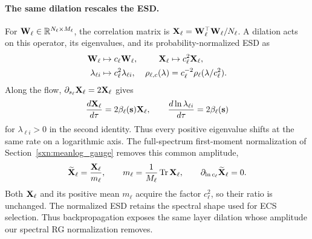 \paragraph{The same dilation rescales the ESD.}
For $\mathbf W_\ell\in\mathbb R^{N_\ell\times M_\ell}$, the correlation matrix is
$\mathbf X_\ell=\mathbf W_\ell^\top\mathbf W_\ell/N_\ell$.
A dilation acts on this operator, its eigenvalues, and its
probability-normalized ESD as
\[
\begin{aligned}
 \mathbf W_\ell&\mapsto c_\ell\mathbf W_\ell,&
 \mathbf X_\ell&\mapsto c_\ell^2\mathbf X_\ell,\\
 \lambda_{\ell i}&\mapsto c_\ell^2\lambda_{\ell i},&
 \rho_{\ell,c}(\lambda)&=c_\ell^{-2}
                 \rho_\ell(\lambda/c_\ell^2).
\end{aligned}
\]
Along the flow, $\partial_{s_\ell}\mathbf X_\ell=2\mathbf X_\ell$ gives
\[
 \frac{d\mathbf X_\ell}{d\tau}=2\beta_\ell(\mathbf s)\mathbf X_\ell,\qquad
 \frac{d\ln\lambda_{\ell i}}{d\tau}=2\beta_\ell(\mathbf s)
\]
for $\lambda_{\ell i}>0$ in the second identity. Thus every
positive eigenvalue shifts at the same rate on a logarithmic axis.
The full-spectrum first-moment normalization of
Section~\ref{sxn:meanlog_gauge} removes this common amplitude,
\[
 \widetilde{\mathbf X}_\ell=\frac{\mathbf X_\ell}{m_\ell},\qquad
 m_\ell=\frac{1}{M_\ell}\operatorname{Tr}\mathbf X_\ell,\qquad
 \partial_{\ln c_\ell}\widetilde{\mathbf X}_\ell=0 .
\]
Both $\mathbf X_\ell$ and its positive mean $m_\ell$ acquire the factor
$c_\ell^2$, so their ratio is unchanged. The normalized ESD retains
the spectral shape used for ECS selection. Thus backpropagation
exposes the same layer dilation whose amplitude our spectral RG
normalization removes.

